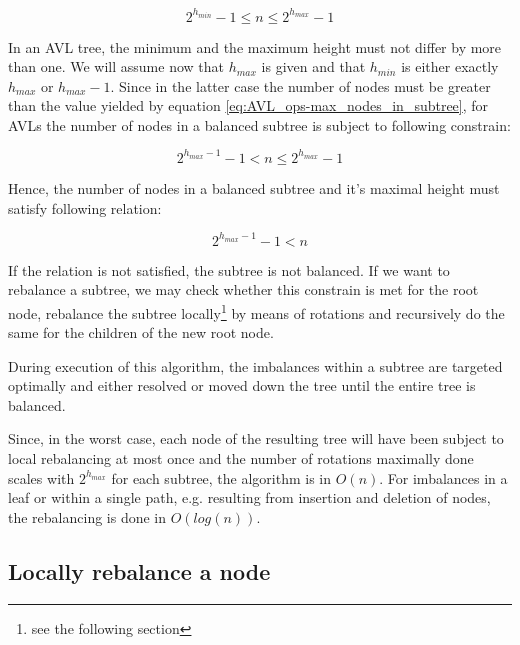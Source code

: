         \begin{equation}
            2^{h_{min}}-1 \leq n \leq 2^{h_{max}}-1
        \end{equation}

        In an AVL tree, the minimum and the maximum height must not differ by
        more than one.
        We will assume now that $h_{max}$ is given and that $h_{min}$ is either
        exactly $h_{max}$ or $h_{max}-1$.
        Since in the latter case the number of nodes must be greater than the
        value yielded by equation \ref{eq:AVL_ops-max_nodes_in_subtree}, for
        AVLs the number of nodes in a balanced subtree is subject to following
        constrain:

        \begin{equation}
            2^{h_{max}-1}-1 < n \leq 2^{h_{max}}-1
        \end{equation}

        Hence, the number of nodes in a balanced subtree and it's maximal
        height must satisfy following relation:

        \begin{equation}
            2^{h_{max}-1}-1 < n
        \end{equation}

        If the relation is not satisfied, the subtree is not balanced.
        If we want to rebalance a subtree, we may check whether this constrain
        is met for the root node, rebalance the subtree locally\footnote{see the
        following section} by means of rotations and recursively do the same for
        the children of the new root node.

        During execution of this algorithm, the imbalances within a subtree are
        targeted optimally and either resolved or moved down the tree until the
        entire tree is balanced.

        Since, in the worst case, each node of the resulting tree will have been
        subject to local rebalancing at most once and the number of rotations
        maximally done scales with $2^{h_{max}}$ for each subtree, the algorithm
        is in $O(n)$.
        For imbalances in a leaf or within a single path, e.g. resulting from
        insertion and deletion of nodes, the rebalancing is done in $O(log(n))$.

    \subsection{Locally rebalance a node}
    \label{sec:AVL_ops-locally-rebalance}

